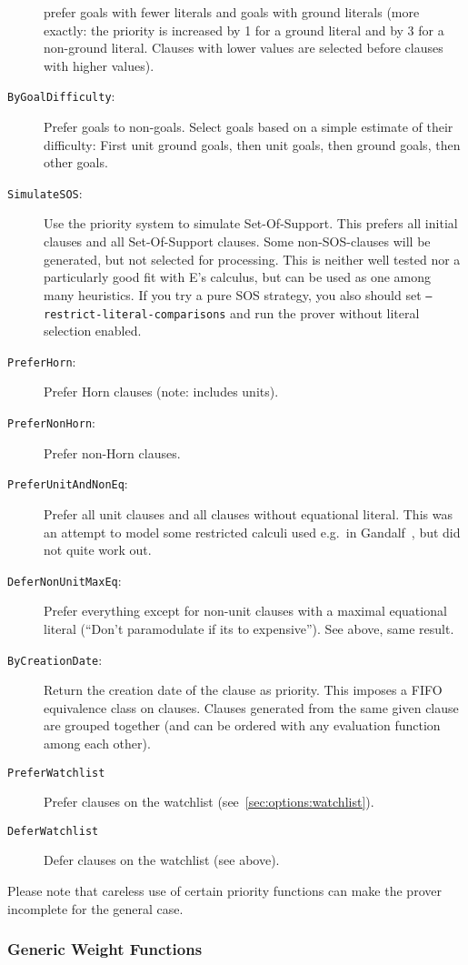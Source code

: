 \documentclass{article}
\begin{document}
\begin{description}
  prefer goals with fewer literals and goals with ground literals
  (more exactly: the priority is increased by 1 for a ground literal
  and by 3 for a non-ground literal. Clauses with lower values are
  selected before clauses with higher values).
\item[\texttt{ByGoalDifficulty}:] Prefer goals to non-goals. Select
  goals based on a simple estimate of their difficulty: First unit
  ground goals, then unit goals, then ground goals, then other goals.
\item[\texttt{SimulateSOS}:] Use the priority system to simulate
  Set-Of-Support. This prefers all initial clauses and all
  Set-Of-Support clauses. Some non-SOS-clauses will be generated, but
  not selected for processing. This is neither well tested nor
  a particularly good fit with E's calculus, but can be used as one
  among many heuristics. If you try a pure SOS strategy, you also
  should set \texttt{--restrict-literal-comparisons} and run the
  prover without literal selection enabled.
\item[\texttt{PreferHorn}:] Prefer Horn clauses (note: includes units).
\item[\texttt{PreferNonHorn}:] Prefer non-Horn clauses.
\item[\texttt{PreferUnitAndNonEq}:] Prefer all unit clauses and all
  clauses without equational literal. This was an attempt to model
  some restricted calculi used e.g.~in Gandalf~\cite{Tammet:JAR-97},
  but did not quite work out.
\item[\texttt{DeferNonUnitMaxEq}:] Prefer everything except for
  non-unit clauses with a maximal equational literal (``Don't
  paramodulate if its to expensive''). See above, same result.
\item[\texttt{ByCreationDate}:] Return the creation date of the clause
  as priority. This imposes a FIFO equivalence class on
  clauses. Clauses generated from the same given clause are grouped
  together (and can be ordered with any evaluation function among each
  other).
\item[\texttt{PreferWatchlist}] Prefer clauses on the watchlist
  (see~\ref{sec:options:watchlist}).
\item[\texttt{DeferWatchlist}] Defer clauses on the watchlist (see
  above).
\end{description}

Please note that careless use of certain priority functions can make
the prover incomplete for the general case.


\subsubsection{Generic Weight Functions}
\end{document}
